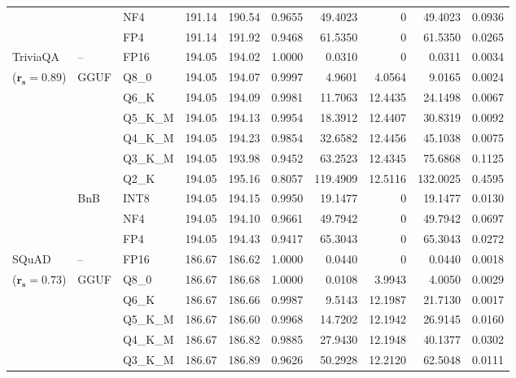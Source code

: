 \begin{longtable}{ll l rrrrrrr}
 &  & NF4 & 191.14 & 190.54 & 0.9655 & 49.4023 & \cellcolor{cyan!12} $0$ & 49.4023 & 0.0936 \\
 &  & FP4 & 191.14 & 191.92 & \cellcolor{red!18} 0.9468 & \cellcolor{red!18} 61.5350 & \cellcolor{cyan!12} $0$ & \cellcolor{red!18} 61.5350 & \cellcolor{red!18} 0.0265 \\
\midrule
TriviaQA & -- & FP16 & 194.05 & 194.02 & 1.0000 & 0.0310 & \cellcolor{cyan!12} $0$ & 0.0311 & 0.0034 \\
{\small ($\mathbf{r_s{=}0.89}$)} & GGUF & Q8\_0 & 194.05 & 194.07 & 0.9997 & 4.9601 & 4.0564 & 9.0165 & 0.0024 \\
 &  & Q6\_K & 194.05 & 194.09 & 0.9981 & 11.7063 & 12.4435 & 24.1498 & 0.0067 \\
 &  & Q5\_K\_M & 194.05 & 194.13 & 0.9954 & 18.3912 & 12.4407 & 30.8319 & 0.0092 \\
 &  & Q4\_K\_M & 194.05 & 194.23 & 0.9854 & 32.6582 & 12.4456 & 45.1038 & 0.0075 \\
 &  & Q3\_K\_M & 194.05 & 193.98 & \cellcolor{red!18} 0.9452 & \cellcolor{red!18} 63.2523 & 12.4345 & \cellcolor{red!18} 75.6868 & \cellcolor{red!18} 0.1125 \\
 &  & Q2\_K & 194.05 & 195.16 & \cellcolor{red!18} 0.8057 & \cellcolor{red!18} 119.4909 & 12.5116 & \cellcolor{red!18} 132.0025 & \cellcolor{red!18} 0.4595 \\
 & BnB & INT8 & 194.05 & 194.15 & 0.9950 & 19.1477 & \cellcolor{cyan!12} $0$ & 19.1477 & 0.0130 \\
 &  & NF4 & 194.05 & 194.10 & 0.9661 & 49.7942 & \cellcolor{cyan!12} $0$ & 49.7942 & 0.0697 \\
 &  & FP4 & 194.05 & 194.43 & \cellcolor{red!18} 0.9417 & \cellcolor{red!18} 65.3043 & \cellcolor{cyan!12} $0$ & \cellcolor{red!18} 65.3043 & \cellcolor{red!18} 0.0272 \\
\midrule
SQuAD & -- & FP16 & 186.67 & 186.62 & 1.0000 & 0.0440 & \cellcolor{cyan!12} $0$ & 0.0440 & 0.0018 \\
{\small ($\mathbf{r_s{=}0.73}$)} & GGUF & Q8\_0 & 186.67 & 186.68 & 1.0000 & 0.0108 & 3.9943 & 4.0050 & 0.0029 \\
 &  & Q6\_K & 186.67 & 186.66 & 0.9987 & 9.5143 & 12.1987 & 21.7130 & 0.0017 \\
 &  & Q5\_K\_M & 186.67 & 186.60 & 0.9968 & 14.7202 & 12.1942 & 26.9145 & 0.0160 \\
 &  & Q4\_K\_M & 186.67 & 186.82 & 0.9885 & 27.9430 & 12.1948 & 40.1377 & 0.0302 \\
 &  & Q3\_K\_M & 186.67 & 186.89 & 0.9626 & 50.2928 & 12.2120 & 62.5048 & 0.0111 \\

\end{longtable}

